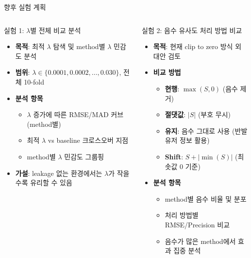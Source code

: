 \documentclass[aspectratio=169,10pt]{beamer}
\begin{document}
\begin{frame}{향후 실험 계획}
	\begin{columns}[T]
			\begin{block}{실험 1: $\lambda$별 전체 비교 분석}
				\begin{itemize}
					\item \textbf{목적}: 최적 $\lambda$ 탐색 및 method별 $\lambda$ 민감도 분석
					\item \textbf{범위}: $\lambda \in \{0.0001, 0.0002, \ldots, 0.030\}$, 전체 10-fold
					\item \textbf{분석 항목}
					\begin{itemize}
						\item $\lambda$ 증가에 따른 RMSE/MAD 커브 (method별)
						\item 최적 $\lambda$ vs baseline 크로스오버 지점
						\item method별 $\lambda$ 민감도 그룹핑
					\end{itemize}
					\item \textbf{가설}: leakage 없는 환경에서는 $\lambda$가 작을수록 유리할 수 있음
				\end{itemize}
			\end{block}

			\begin{block}{실험 2: 음수 유사도 처리 방법 비교}
				\begin{itemize}
					\item \textbf{목적}: 현재 clip to zero 방식 외 대안 검토
					\item \textbf{비교 방법}
					\begin{itemize}
						\item \textbf{현행}: $\max(S, 0)$ (음수 제거)
						\item \textbf{절댓값}: $|S|$ (부호 무시)
						\item \textbf{유지}: 음수 그대로 사용 (반발 유저 정보 활용)
						\item \textbf{Shift}: $S + |\min(S)|$ (최솟값 0 기준)
					\end{itemize}
					\item \textbf{분석 항목}
					\begin{itemize}
						\item method별 음수 비율 및 분포
						\item 처리 방법별 RMSE/Precision 비교
						\item 음수가 많은 method에서 효과 집중 분석
					\end{itemize}
				\end{itemize}
			\end{block}
	\end{columns}
\end{frame}
\end{document}
